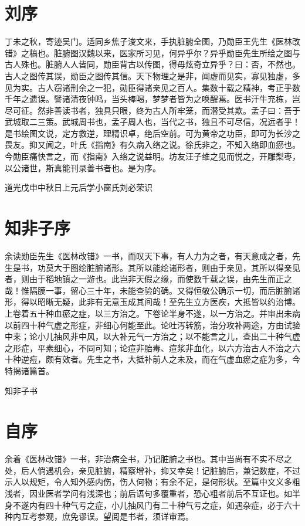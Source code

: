 \documentclass[a4paper,12pt,UTF8,twoside]{ctexbook}
\begin{document}
	\chapter{刘序}
	
	
	丁未之秋，寄迹吴门。适同乡焦子浚文来，手执脏腑全图，乃勋臣王先生《医林改错》之稿也。脏腑图汉魏以来，医家所习见，何异乎尔？异乎勋臣先生所绘之图与古人殊也。脏腑人人皆同，勋臣背古以传图，得毋炫奇立异乎？曰：否，不然也。古人之图传其误，勋臣之图传其信。天下物理之是非，闻虚而见实，寡见独虚，多见为实。古人窃诸刑余之一犯，勋臣得诸亲见之百人。集数十载之精神，考正乎数千年之遗误。譬诸清夜钟鸣，当头棒喝，梦梦者皆为之唤醒焉。医书汗牛充栋，岂尽可征。然非善读书者，独具只眼，终为古人所牢笼，而潜受其欺。孟子曰：吾于武城取二三策。武城周书也，孟子周人也，当代之书，独且不可尽信，况远者乎！是书绘图文说，定方救逆，理精识卓，绝后空前。可为黄帝之功臣，即可为长沙之畏友。抑又闻之，叶氏《指南》有久病入络之说。徐氏非之，不知入络即血瘀也。今勋臣痛快言之，而《指南》入络之说益明。坊友汪子维之见而悦之，开雕梨枣，以公诸世，斯真能刊录善书者也。是为序。
	
	道光戊申中秋日上元后学小窗氏刘必荣识
	
	
	\chapter{知非子序}
	
	
	余读勋臣先生《医林改错》一书，而叹天下事，有人力为之者，有天意成之者，先生是书，功莫大于图绘脏腑诸形。其所以能绘诸形者，则由于亲见，其所以得亲见者，则由于稻地镇之一游也。此岂非天假之缘，而使数千载之误，由先生而正之哉！惟隔膜一事，留心三十年，未能查验的确。又得恒敬公确示一切，而后脏腑诸形，得以昭晰无疑，此非有无意玉成其间哉！至先生立方医疾，大抵皆以约治博。上卷着五十种血瘀之症，以三方治之。下卷论半身不遂，以一方治之。并审出未病以前四十种气虚之形症，非细心何能至此。论吐泻转筋，治分攻补两途，方由试验中来；论小儿抽风非中风，以大补元气一方治之；以不能言之儿，查出二十种气虚之形症，平素细心，不同可知；论痘非胎毒、痘浆非血化，以六方治古人不治之六十种逆痘，颇有效者。先生之书，大抵补前人之未及，而在气虚血瘀之症为多，今特揭诸篇首。
	
	知非子书
	
	\chapter{自序}
	
	
	余着《医林改错》一书，非治病全书，乃记脏腑之书也。其中当尚有不实不尽之处，后人倘遇机会，亲见脏腑，精察增补，抑又幸矣！记脏腑后，兼记数症，不过示人以规矩，令人知外感内伤，伤人何物；有余不足，是何形状。至篇中文义多粗浅者，因业医者学问有浅深也；前后语句多覆重者，恐心粗者前后不互证也。如半身不遂内有四十种气亏之症，小儿抽风门有二十种气亏之症，如遇杂症，必于六十种内互考参观，庶免谬误。望阅是书者，须详审焉。
	
\end{document}
